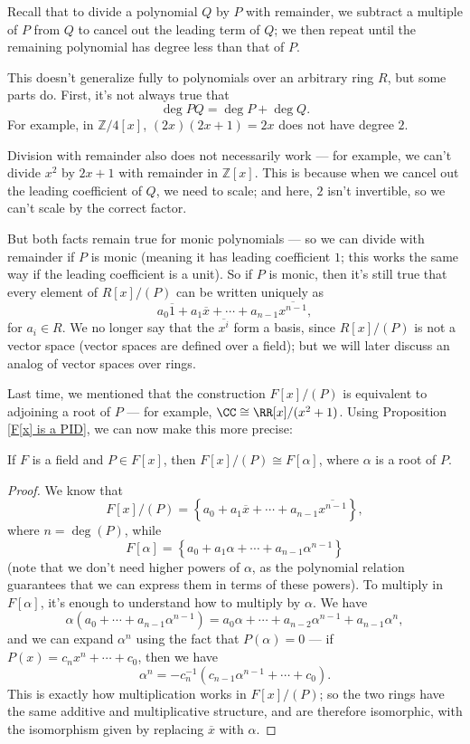 Recall that to divide a polynomial $Q$ by $P$ with remainder, we subtract a multiple of $P$ from $Q$ to cancel out the leading term of $Q$; we then repeat until the remaining polynomial has degree less than that of $P$. 

\begin{note}
    This doesn't generalize fully to polynomials over an arbitrary ring $R$, but some parts do. First, it's not always true that \[\deg PQ = \deg P + \deg Q.\] For example, in $\mathbb{Z}/4[x]$, $(2x)(2x + 1) = 2x$ does not have degree $2$.
    
    Division with remainder also does not necessarily work --- for example, we can't divide $x^2$ by $2x + 1$ with remainder in $\mathbb{Z}[x]$. This is because when we cancel out the leading coefficient of $Q$, we need to scale; and here, $2$ isn't invertible, so we can't scale by the correct factor.

    But both facts remain true for monic polynomials --- so we can divide with remainder if $P$ is monic (meaning it has leading coefficient $1$; this works the same way if the leading coefficient is a unit). So if $P$ is monic, then it's still true that every element of $R[x]/(P)$ can be written uniquely as \[a_0\overline{1} + a_1\overline{x} + \cdots + a_{n - 1}\overline{x^{n - 1}},\] for $a_i \in R$. We no longer say that the $\overline{x^i}$ form a basis, since $R[x]/(P)$ is not a vector space (vector spaces are defined over a field); but we will later discuss an analog of vector spaces over rings.
\end{note}

Last time, we mentioned that the construction $F[x]/(P)$ is equivalent to adjoining a root of $P$ --- for example, $\CC \cong \RR[x]/(x^2 + 1)$. Using Proposition \ref{F[x] is a PID}, we can now make this more precise: 

\begin{proposition}
If $F$ is a field and $P \in F[x]$, then $F[x]/(P) \cong F[\alpha]$, where $\alpha$ is a root of $P$. 
\end{proposition}

\begin{proof}
We know that \[F[x]/(P) = \left\{a_0 + a_1\overline{x} + \cdots + a_{n - 1}\overline{x^{n - 1}}\right\},\] where $n = \deg(P)$, while \[F[\alpha] = \left\{a_0 + a_1\alpha + \cdots + a_{n - 1}\alpha^{n - 1}\right\}\] (note that we don't need higher powers of $\alpha$, as the polynomial relation guarantees that we can express them in terms of these powers). To multiply in $F[\alpha]$, it's enough to understand how to multiply by $\alpha$. We have \[\alpha(a_0 + \cdots + a_{n - 1}\alpha^{n - 1}) = a_0\alpha + \cdots + a_{n - 2}\alpha^{n - 1} + a_{n - 1}\alpha^n,\] and we can expand $\alpha^n$ using the fact that $P(\alpha) = 0$ --- if $P(x) = c_nx^n + \cdots + c_0$, then we have \[\alpha^n = -c_n^{-1}(c_{n - 1}\alpha^{n - 1} + \cdots + c_0).\] This is exactly how multiplication works in $F[x]/(P)$; so the two rings have the same additive and multiplicative structure, and are therefore isomorphic, with the isomorphism given by replacing $\overline{x}$ with $\alpha$. 
\end{proof}

